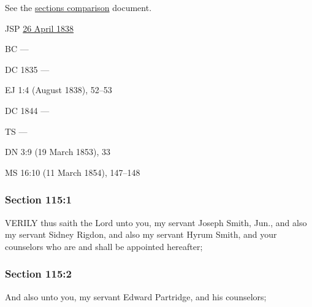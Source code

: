 		See the \href{https://drive.google.com/file/d/1goAvNz8jS4R8slYfMG_db55Ty2z_vmgK/view?usp=sharing}{sections comparison} document.
	
		\begin{compactdesc}
			\item[JSP] \hyperref[EMS-1838-JS-26-APR-1838]{26 April 1838}
			\item[BC] ---
			\item[DC 1835] ---
			\item[EJ] 1:4 (August 1838), 52--53
			\item[DC 1844] ---
			\item[TS] ---
			\item[DN] 3:9 (19 March 1853), 33
			\item[MS] 16:10 (11 March 1854), 147--148
		\end{compactdesc}

	\subsubsection{Section 115:1} %
		\label{DC115-1}

		VERILY thus saith the Lord unto you, my servant Joseph Smith, Jun., and also my servant Sidney Rigdon, and also my servant Hyrum Smith, and your counselors who are and shall be appointed hereafter;


	\subsubsection{Section 115:2} %
		\label{DC115-2}

		And also unto you, my servant Edward Partridge, and his counselors;


